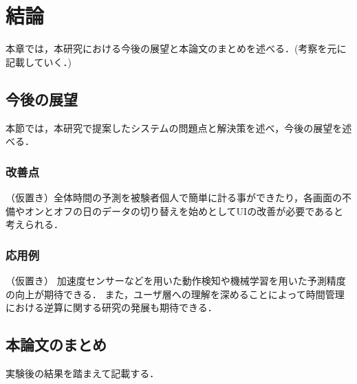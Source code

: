 \chapter{結論}
本章では，本研究における今後の展望と本論文のまとめを述べる．(考察を元に記載していく．)
\section{今後の展望}
本節では，本研究で提案したシステムの問題点と解決策を述べ，今後の展望を述べる．

\subsection{改善点}
（仮置き）全体時間の予測を被験者個人で簡単に計る事ができたり，各画面の不備やオンとオフの日のデータの切り替えを始めとしてUIの改善が必要であると考えられる．

\subsection{応用例}
（仮置き）
加速度センサーなどを用いた動作検知や機械学習を用いた予測精度の向上が期待できる．
また，ユーザ層への理解を深めることによって時間管理における逆算に関する研究の発展も期待できる．
\section{本論文のまとめ}
実験後の結果を踏まえて記載する．